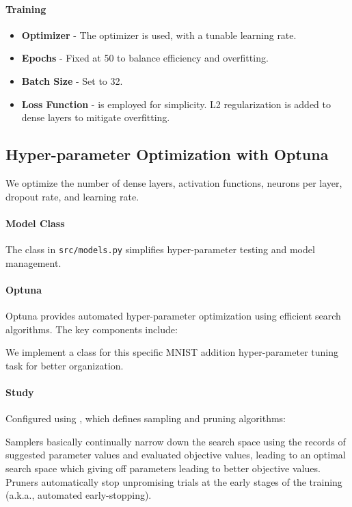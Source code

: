 \documentclass{article}
\begin{document}
\paragraph{Training}
\begin{itemize}
    \item \textbf{Optimizer} - The  optimizer is used, with a tunable learning rate.
    \item \textbf{Epochs} - Fixed at 50 to balance efficiency and overfitting.
    \item \textbf{Batch Size} - Set to 32.
    \item \textbf{Loss Function} -  is employed for simplicity. L2 regularization is added to dense layers to mitigate overfitting.
\end{itemize}

\subsection{Hyper-parameter Optimization with Optuna}

We optimize the number of dense layers, activation functions, neurons per layer, dropout rate, and learning rate.


\paragraph{Model Class}
The  class in \texttt{src/models.py} simplifies hyper-parameter testing and model management.

\paragraph{Optuna}
Optuna\cite{optuna} provides automated hyper-parameter optimization using efficient search algorithms. The key components include:

We implement a class  for this specific MNIST addition hyper-parameter tuning task for better organization.

\paragraph{Study}
Configured using , which defines sampling and pruning algorithms:

Samplers basically continually narrow down the search space using the records of suggested parameter values and evaluated objective values, leading to an optimal search space which giving off parameters leading to better objective values. Pruners automatically stop unpromising trials at the early stages of the training (a.k.a., automated early-stopping).\cite{optuna_tutorial_efficient_algorithms}
\end{document}
